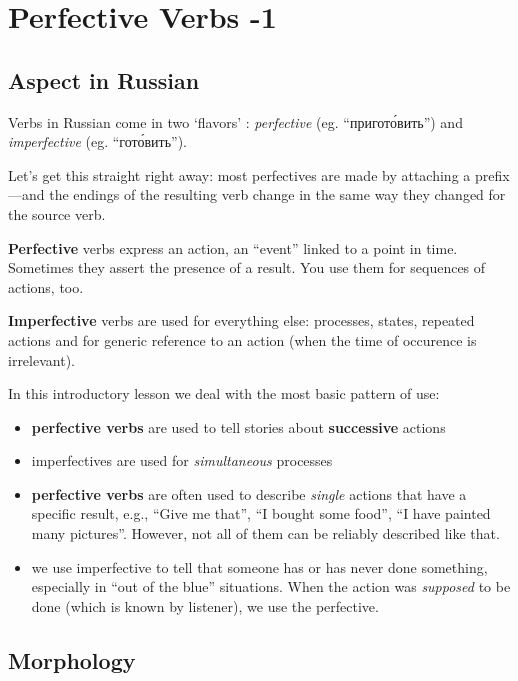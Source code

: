 \chapter{Perfective Verbs -1}\label{perfective-verbs--1}

\section{Aspect in Russian}\label{aspect-in-russian}

Verbs in Russian come in two `flavors' : \emph{perfective} (eg.
``пригот\'{о}вить'') and \emph{imperfective} (eg. ``гот\'{о}вить'').

Let's get this straight right away: most perfectives are made by
attaching a prefix---and the endings of the resulting verb change in the
same way they changed for the source verb.

\textbf{Perfective} verbs express an action, an ``event'' linked to a
point in time. Sometimes they assert the presence of a result. You use
them for sequences of actions, too.

\textbf{Imperfective} verbs are used for everything else: processes,
states, repeated actions and for generic reference to an action (when
the time of occurence is irrelevant).

In this introductory lesson we deal with the most basic pattern of use:

\begin{itemize}
\tightlist
\item
  \textbf{perfective verbs} are used to tell stories about
  \textbf{successive} actions
\item
  imperfectives are used for \emph{simultaneous} processes
\item
  \textbf{perfective verbs} are often used to describe \emph{single}
  actions that have a specific result, e.g., ``Give me that'', ``I
  bought some food'', ``I have painted many pictures''. However, not all
  of them can be reliably described like that.
\item
  we use imperfective to tell that someone has or has never done
  something, especially in ``out of the blue'' situations. When the
  action was \emph{supposed} to be done (which is known by listener), we
  use the perfective.
\end{itemize}

\section{Morphology}\label{morphology}

